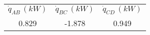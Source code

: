 \begin{tabular}{ccc}
\hline
 $\dot{q}_{AB}\,\left(kW\right)$ & $\dot{q}_{BC}\,\left(kW\right)$ & $\dot{q}_{CD}\,\left(kW\right)$ \\
0.829 & -1.878 & 0.949 \\
\hline
\end{tabular}
